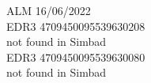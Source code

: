 ALM 16/06/2022\\
EDR3 4709450095539630208\\
not found in Simbad\\
EDR3 4709450095539630080\\
not found in Simbad\\
